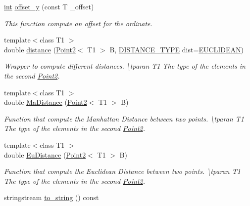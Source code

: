 \begin{DoxyCompactItemize}
\mbox{\hyperlink{draw_8hh_aa620a13339ac3a1177c86edc549fda9b}{int}} \mbox{\hyperlink{class_point2_a2f976fd1f064746ae5afb97a484afa13}{offset\+\_\+y}} (const T \+\_\+offset)
\begin{DoxyCompactList}\small\item\em This function compute an offset for the ordinate. \end{DoxyCompactList}\item 
{\footnotesize template$<$class T1 $>$ }\\double \mbox{\hyperlink{class_point2_a5f50f8f110af78415a56b0c32c2c8b8f}{distance}} (\mbox{\hyperlink{class_point2}{Point2}}$<$ T1 $>$ B, \mbox{\hyperlink{maths_8hh_ac50d7263b1cae8691420b86282b27f90}{D\+I\+S\+T\+A\+N\+C\+E\+\_\+\+T\+Y\+PE}} dist=\mbox{\hyperlink{maths_8hh_ac50d7263b1cae8691420b86282b27f90a81bbbc4428c3ff3f1327e94957e2b5f1}{E\+U\+C\+L\+I\+D\+E\+AN}})
\begin{DoxyCompactList}\small\item\em Wrapper to compute different distances. \textbackslash{}tparan T1 The type of the elements in the second {\ttfamily \mbox{\hyperlink{class_point2}{Point2}}}. \end{DoxyCompactList}\item 
{\footnotesize template$<$class T1 $>$ }\\double \mbox{\hyperlink{class_point2_a10a4aa3d7939b1675f4bd18b8f9f0ead}{Ma\+Distance}} (\mbox{\hyperlink{class_point2}{Point2}}$<$ T1 $>$ B)
\begin{DoxyCompactList}\small\item\em Function that compute the Manhattan Distance between two points. \textbackslash{}tparan T1 The type of the elements in the second {\ttfamily \mbox{\hyperlink{class_point2}{Point2}}}. \end{DoxyCompactList}\item 
{\footnotesize template$<$class T1 $>$ }\\double \mbox{\hyperlink{class_point2_aa930b619ed2efeda96b4210ee3b8cb9c}{Eu\+Distance}} (\mbox{\hyperlink{class_point2}{Point2}}$<$ T1 $>$ B)
\begin{DoxyCompactList}\small\item\em Function that compute the Euclidean Distance between two points. \textbackslash{}tparan T1 The type of the elements in the second {\ttfamily \mbox{\hyperlink{class_point2}{Point2}}}. \end{DoxyCompactList}\item 
stringstream \mbox{\hyperlink{class_point2_aa04082290a2f554060081beafd7d7e0d}{to\+\_\+string}} () const

\end{DoxyCompactItemize}
